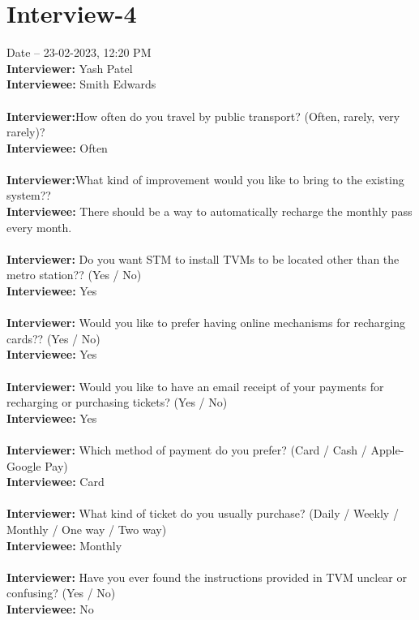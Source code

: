 \documentclass[a4paper,12pt]{report}
\begin{document}
\section{Interview-4}
Date – 23-02-2023, 12:20 PM\\
\textbf{Interviewer:} Yash Patel\\
\textbf{Interviewee:} Smith Edwards \\\\
\textbf{Interviewer:}How often do you travel by public transport? (Often, rarely, very rarely)?\\
\textbf{Interviewee:} Often\\\\
\textbf{Interviewer:}What kind of improvement would you like to bring to the existing system??\\
\textbf{Interviewee:} There should be a way to automatically recharge the monthly pass every month.\\\\
\textbf{Interviewer:} Do you want STM to install TVMs to be located other than the metro station?? (Yes / No)\\
\textbf{Interviewee:} Yes\\\\
\textbf{Interviewer:}  Would you like to prefer having online mechanisms for recharging cards?? (Yes / No)\\
\textbf{Interviewee:} Yes\\\\
\textbf{Interviewer:} Would you like to have an email receipt of your payments for recharging or purchasing tickets? (Yes / No)\\
\textbf{Interviewee:} Yes\\\\
\textbf{Interviewer:}  Which method of payment do you prefer? (Card / Cash / Apple-Google Pay)\\
\textbf{Interviewee:} Card\\\\
\textbf{Interviewer:} What kind of ticket do you usually purchase? (Daily / Weekly /  Monthly / One way / Two way) \\
\textbf{Interviewee:} Monthly \\\\
\textbf{Interviewer:} Have you ever found the instructions provided
in TVM unclear or confusing? (Yes / No)\\
\textbf{Interviewee:} No\\\\
\end{document}
